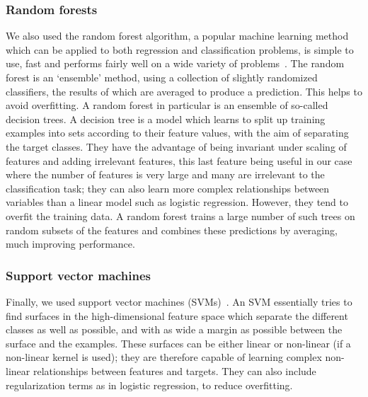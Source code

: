 \documentclass[10pt,letterpaper]{article}
\begin{document}

\subsubsection*{Random forests}
We also used the random forest algorithm, a popular machine learning method which can be applied to both regression and classification problems, is simple to use, fast and performs fairly well on a wide variety of problems~\cite{Hastie2009}. The random forest is an `ensemble' method, using a collection of slightly randomized classifiers, the results of which are averaged to produce a prediction. This helps to avoid overfitting. A random forest in particular is an ensemble of so-called decision trees. A decision tree is a model which learns to split up training examples into sets according to their feature values, with the aim of separating the target classes. They have the advantage of being invariant under scaling of features and adding irrelevant features, this last feature being useful in our case where the number of features is very large and many are irrelevant to the classification task; they can also learn more complex relationships between variables than a linear model such as logistic regression. However, they tend to overfit the training data. A random forest trains a large number of such trees on random subsets of the features and combines these predictions by averaging, much improving performance. 

\subsubsection*{Support vector machines}
Finally, we used support vector machines (SVMs)~\cite{Hastie2009b}. An SVM essentially tries to find surfaces in the high-dimensional feature space which separate the different classes as well as possible, and with as wide a margin as possible between the surface and the examples. These surfaces can be either linear or non-linear (if a non-linear kernel is used); they are therefore capable of learning complex non-linear relationships between features and targets. They can also include regularization terms as in logistic regression, to reduce overfitting. 
\end{document}
